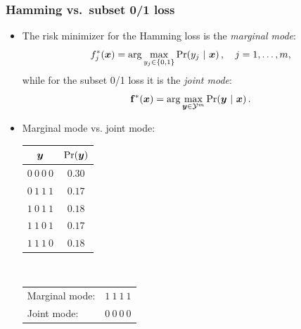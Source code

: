\begin{frame}
	\frametitle{Hamming vs.\ subset 0/1 loss}
	\begin{itemize}
		\item The risk minimizer for the Hamming loss is the  \emph{marginal mode}:
		$$
		f_j^*(\bm{x}) = \arg \max_{y_j \in \{0,1\}} \Pr( y_j  ~|~ \bm{x} )\,, \quad j = 1,\ldots,m ,
		$$
		while for the subset 0/1 loss it is the \emph{joint mode}:
		$$
		\mathbf{f}^*(\bm{x}) = \arg \max_{\bm{y} \in \mathcal{Y}^m} \Pr(\bm{y} ~|~ \bm{x}) \,.
		$$
		\item Marginal mode vs. joint mode:\\[6pt]
		\begin{center}
			\begin{tabular}{@{}cc@{}}
				\toprule
				$\bm{y}$ & $\Pr(\bm{y})$ \\
				\hline
				$0~0~0~0$ & $0.30$ \\
				$0~1~1~1$ & $0.17$ \\
				$1~0~1~1$ & $0.18$ \\
				$1~1~0~1$ & $0.17$ \\
				$1~1~1~0$ & $0.18$ \\
				\toprule
			\end{tabular}
			$\qquad$
			\footnotesize{
				\begin{tabular}{lr}
					Marginal mode: & $1~1~1~1$ \\
					Joint mode: & $0~0~0~0$ \\
				\end{tabular}
			}
		\end{center}
	\end{itemize}
\end{frame}



